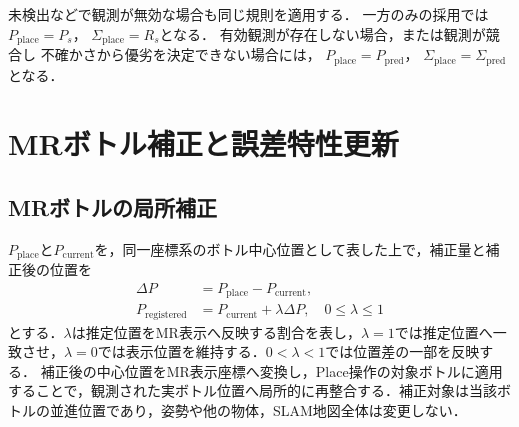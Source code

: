 \documentclass{sice-si}
\newenvironment{dotsubequations}{%
  \begin{subequations}
  \renewcommand{\theequation}{\theparentequation.\arabic{equation}}%
}{\end{subequations}}
\begin{document}
未検出などで観測が無効な場合も同じ規則を適用する．
一方のみの採用では
$P_{\mathrm{place}}=P_s$，
$\Sigma_{\mathrm{place}}=R_s$となる．
有効観測が存在しない場合，または観測が競合し
不確かさから優劣を決定できない場合には，
$P_{\mathrm{place}}=P_{\mathrm{pred}}$，
$\Sigma_{\mathrm{place}}=\Sigma_{\mathrm{pred}}$となる．
\vspace{2pt}

\section{MRボトル補正と誤差特性更新}
\subsection{MRボトルの局所補正}
$P_{\mathrm{place}}$と$P_{\mathrm{current}}$を，同一座標系のボトル中心位置として表した上で，補正量と補正後の位置を
\begin{dotsubequations}
\begin{align}
\Delta P&=P_{\mathrm{place}}-P_{\mathrm{current}},
\label{eq:delta}\\
P_{\mathrm{registered}}&=P_{\mathrm{current}}+\lambda\Delta P,
\quad 0\leq\lambda\leq1
\label{eq:registration}
\end{align}
\end{dotsubequations}
とする．$\lambda$は推定位置をMR表示へ反映する割合を表し，$\lambda=1$では推定位置へ一致させ，$\lambda=0$では表示位置を維持する．$0<\lambda<1$では位置差の一部を反映する．
補正後の中心位置をMR表示座標へ変換し，Place操作の対象ボトルに適用することで，観測された実ボトル位置へ局所的に再整合する．補正対象は当該ボトルの並進位置であり，姿勢や他の物体，SLAM地図全体は変更しない．
\end{document}
